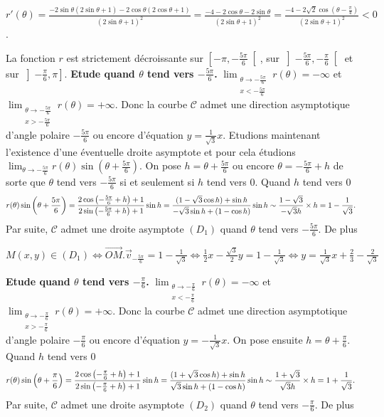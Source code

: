 {{\begin{center}
$r'(\theta)=\frac{-2\sin\theta(2\sin\theta+1)-2\cos\theta(2\cos\theta+1)}{(2\sin\theta+1)^2}=\frac{-4-2\cos\theta-2\sin\theta}{(2\sin\theta+1)^2}=\frac{-4-2\sqrt{2}\cos\left(\theta-\frac{\pi}{4}\right)}{(2\sin\theta+1)^2}<0$.
\end{center}
La fonction $r$ est strictement décroissante sur $\left[-\pi,-\frac{5\pi}{6}\right[$, sur $\left]-\frac{5\pi}{6},-\frac{\pi}{6}\right[$ et sur $\left]-\frac{\pi}{6},\pi\right]$.
\textbf{Etude quand $\theta$ tend vers $-\frac{5\pi}{6}$.} $\displaystyle\lim_{\substack{\theta\rightarrow-\frac{5\pi}{6}\\ x<-\frac{5\pi}{6}}}r(\theta)=-\infty$ et $\displaystyle\lim_{\substack{\theta\rightarrow-\frac{5\pi}{6}\\ x>-\frac{5\pi}{6}}}r(\theta)=+\infty$. Donc la courbe $\mathcal{C}$ admet une direction asymptotique d'angle polaire $-\frac{5\pi}{6}$ ou encore d'équation $y=\frac{1}{\sqrt{3}}x$. Etudions maintenant l'existence d'une éventuelle droite asymptote et pour cela étudions $\lim_{\theta \rightarrow -\frac{5\pi}{6}}r(\theta)\sin\left(\theta+\frac{5\pi}{6}\right)$.
On pose $h=\theta+\frac{5\pi}{6}$ ou encore $\theta=-\frac{5\pi}{6}+h$ de sorte que $\theta$ tend vers $-\frac{5\pi}{6}$ si et seulement si $h$ tend vers $0$. Quand $h$ tend vers $0$
\begin{align*}\ensuremath
r(\theta)\sin\left(\theta+\frac{5\pi}{6}\right)&=\frac{2\cos\left(-\frac{5\pi}{6}+h\right)+1}{2\sin\left(-\frac{5\pi}{6}+h\right)+1}\sin h=\frac{(1-\sqrt{3}\cos h)+\sin h}{-\sqrt{3}\sin h+(1-\cos h)}\sin h\sim\frac{1-\sqrt{3}}{-\sqrt{3}h}\times h=1-\frac{1}{\sqrt{3}}.
\end{align*}
Par suite, $\mathcal{C}$ admet une droite asymptote $(D_1)$ quand $\theta$ tend vers $-\frac{5\pi}{6}$. De plus

\begin{center}
$M(x,y)\in(D_1)\Leftrightarrow \overrightarrow{OM}.\overrightarrow{v}_{-\frac{5\pi}{6}}=1-\frac{1}{\sqrt{3}}\Leftrightarrow\frac{1}{2}x-\frac{\sqrt{3}}{2}y=1-\frac{1}{\sqrt{3}}\Leftrightarrow y=\frac{1}{\sqrt{3}}x+\frac{2}{3}-\frac{2}{\sqrt{3}}$
\end{center}
\textbf{Etude quand $\theta$ tend vers $-\frac{\pi}{6}$.} $\displaystyle\lim_{\substack{\theta\rightarrow-\frac{\pi}{6}\\ x<-\frac{\pi}{6}}}r(\theta)=-\infty$ et $\displaystyle\lim_{\substack{\theta\rightarrow-\frac{\pi}{6}\\ x>-\frac{\pi}{6}}}r(\theta)=+\infty$. Donc la courbe $\mathcal{C}$ admet une direction asymptotique d'angle polaire $-\frac{\pi}{6}$ ou encore d'équation $y=-\frac{1}{\sqrt{3}}x$.
On pose ensuite $h=\theta+\frac{\pi}{6}$. Quand $h$ tend vers $0$
\begin{align*}\ensuremath
r(\theta)\sin\left(\theta+\frac{\pi}{6}\right)&=\frac{2\cos\left(-\frac{\pi}{6}+h\right)+1}{2\sin\left(-\frac{\pi}{6}+h\right)+1}\sin h=\frac{(1+\sqrt{3}\cos h)+\sin h}{\sqrt{3}\sin h+(1-\cos h)}\sin h\sim\frac{1+\sqrt{3}}{\sqrt{3}h}\times h=1+\frac{1}{\sqrt{3}}.
\end{align*}
Par suite, $\mathcal{C}$ admet une droite asymptote $(D_2)$ quand $\theta$ tend vers $-\frac{\pi}{6}$. De plus

}}
